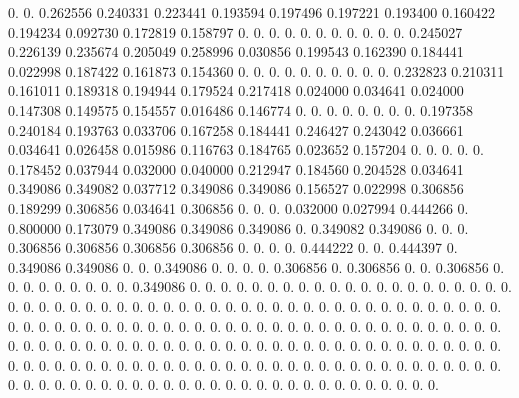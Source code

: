 0.  0.  0.262556   0.240331   0.223441   0.193594   0.197496   0.197221   0.193400   0.160422   0.194234   0.092730   0.172819   0.158797   0.  0.  0.  0.  0.  0.  0.  0.  0.  
0.  0.  0.245027   0.226139   0.235674   0.205049   0.258996   0.030856   0.199543   0.162390   0.184441   0.022998   0.187422   0.161873   0.154360   0.  0.  0.  0.  0.  0.  0.  0.  
0.  0.  0.232823   0.210311   0.161011   0.189318   0.194944   0.179524   0.217418   0.024000   0.034641   0.024000   0.147308   0.149575   0.154557   0.016486   0.146774   0.  0.  0.  0.  0.  0.  
0.  0.  0.197358   0.240184   0.193763   0.033706   0.167258   0.184441   0.246427   0.243042   0.036661   0.034641   0.026458   0.015986   0.116763   0.184765   0.023652   0.157204   0.  0.  0.  0.  0.  
0.178452   0.037944   0.032000   0.040000   0.212947   0.184560   0.204528   0.034641   0.349086   0.349082   0.037712   0.349086   0.349086   0.156527   0.022998   0.306856   0.189299   0.306856   0.034641   0.306856   0.  0.  0.  
0.032000   0.027994   0.444266   0.  0.800000   0.173079   0.349086   0.349086   0.349086   0.  0.349082   0.349086   0.  0.  0.  0.306856   0.306856   0.306856   0.306856   0.  0.  0.  0.  
0.444222   0.  0.  0.444397   0.  0.349086   0.349086   0.  0.  0.349086   0.  0.  0.  0.  0.306856   0.  0.306856   0.  0.  0.306856   0.  0.  0.  
0.  0.  0.  0.  0.  0.  0.349086   0.  0.  0.  0.  0.  0.  0.  0.  0.  0.  0.  0.  0.  0.  0.  0.  
0.  0.  0.  0.  0.  0.  0.  0.  0.  0.  0.  0.  0.  0.  0.  0.  0.  0.  0.  0.  0.  0.  0.  
0.  0.  0.  0.  0.  0.  0.  0.  0.  0.  0.  0.  0.  0.  0.  0.  0.  0.  0.  0.  0.  0.  0.  
0.  0.  0.  0.  0.  0.  0.  0.  0.  0.  0.  0.  0.  0.  0.  0.  0.  0.  0.  0.  0.  0.  0.  
0.  0.  0.  0.  0.  0.  0.  0.  0.  0.  0.  0.  0.  0.  0.  0.  0.  0.  0.  0.  0.  0.  0.  
0.  0.  0.  0.  0.  0.  0.  0.  0.  0.  0.  0.  0.  0.  0.  0.  0.  0.  0.  0.  0.  0.  0.  
0.  0.  0.  0.  0.  0.  0.  0.  0.  0.  0.  0.  0.  0.  0.  0.  0.  0.  0.  0.  0.  0.  0.  
0.  0.  0.  0.  0.  0.  0.  0.  0.  0.  0.  0.  0.  0.  0.  0.  0.  0.  0.  0.  0.  0.  0.  
